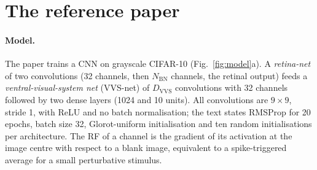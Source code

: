 \documentclass[11pt,a4paper]{article}
\newcommand{\NBN}{N_{\mathrm{BN}}}
\newcommand{\DVVS}{D_{\mathrm{VVS}}}
\begin{document}
\section{The reference paper}\label{sec:paper}
\paragraph{Model.} The paper trains a CNN on grayscale CIFAR-10 \cite{krizhevsky2009} (Fig.~\ref{fig:model}a). A \emph{retina-net} of two convolutions (32 channels, then $\NBN$ channels, the retinal output) feeds a \emph{ventral-visual-system net} (VVS-net) of $\DVVS$ convolutions with 32 channels followed by two dense layers (1024 and 10 units). All convolutions are $9\times9$, stride 1, with ReLU and no batch normalisation; the text states RMSProp for 20 epochs, batch size 32, Glorot-uniform initialisation \cite{glorot2010} and ten random initialisations per architecture. The RF of a channel is the gradient of its activation at the image centre with respect to a blank image, equivalent to a spike-triggered average for a small perturbative stimulus.
\end{document}
